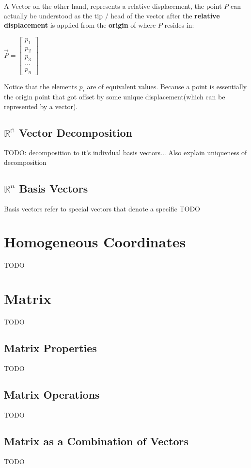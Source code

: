 A Vector on the other hand, represents a relative displacement, the point $P$ can actually be understood as the tip / head of the vector
after the \textbf{relative displacement} is applied from the \textbf{origin} of where $P$ resides in:
\begin{center}
    $\vec{P}=\begin{bmatrix}p_1 \\ p_2 \\ p_3 \\ ... \\ p_n\end{bmatrix}$
\end{center}

Notice that the elements $p_i$ are of equivalent values. Because a point is essentially the origin point
that got offset by some unique displacement(which can be represented by a vector).


\subsection{$\mathbb{R^n}$ Vector Decomposition}
TODO: decomposition to it's indivdual basis vectors...
Also explain uniqueness of decomposition


\subsection{$\mathbb{R}^n$ Basis Vectors}
Basis vectors refer to special vectors that denote a specific
TODO


\section{Homogeneous Coordinates}
TODO

\section{Matrix}
TODO

\subsection{Matrix Properties}
TODO

\subsection{Matrix Operations}
TODO

\subsection{Matrix as a Combination of Vectors}
TODO

